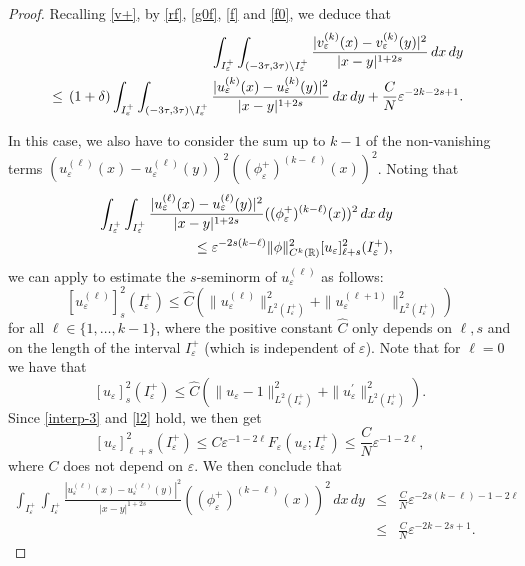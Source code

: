 \documentclass{article}
\newcommand{\e}{\varepsilon}
\begin{document}
\begin{proof}
Recalling \eqref{v+}, by \eqref{rf}, \eqref{g0f}, \eqref{f} and \eqref{f0}, we deduce that 
\begin{eqnarray}\label{tau+}
&&\hspace{-12mm}\int_{I_\e^+}\int_{(-3\tau,3\tau)\setminus I_\e^+}\frac{|v_\e^{(k)}(x)-v_\e^{(k)}(y)|^2}{|x-y|^{1+2s}}\, dx\, dy \nonumber\\
&\hspace{-2mm}\leq&\hspace{-2mm}(1+\delta) \int_{I_\e^+}\int_{(-3\tau,3\tau)\setminus I_\e^+}\frac{|u_\e^{(k)}(x)-u_\e^{(k)}(y)|^2}{|x-y|^{1+2s}}\, dx\, dy+\frac{C}{N}\e^{-2k-2s+1}. 
\end{eqnarray} 

\smallskip 

\noindent{\em Case $3\colon$ $x,y\in I_\e^+$.}

\smallskip
 In this case, we also have to consider the sum up to $k-1$ of the non-vanishing terms
$(u_\e^{(\ell)}(x)-u_\e^{(\ell)}(y))^2((\phi_\e^+)^{(k-\ell)}(x))^2$. 
Noting that 
\begin{eqnarray*}
&&\hspace{-1cm}\int_{I_\e^+}\int_{I_\e^+} \frac{|u_\e^{(\ell)}(x)-u_\e^{(\ell)}(y)|^2}{|x-y|^{1+2s}} ((\phi_\e^+)^{(k-\ell)}(x))^2\, dx\, dy\\
&&\leq \e^{-2s(k-\ell)}\|\phi\|_{C^k(\mathbb R)}^2[u_\e]^2_{\ell+s}(I_\e^+),  
\end{eqnarray*}
we can apply \cite[Theorem 1.25]{leofrac} to estimate the $s$-seminorm of $u^{(\ell)}_\e$ as follows: 
\begin{equation}\label{semi}
[u^{(\ell)}_\e]^2_s(I_\e^+)\leq  \hat C(\|u_\e^{(\ell)}\|^2_{L^2(I_\e^+)}+\|u_\e^{(\ell+1)}\|^2_{L^2(I_\e^+)})
\end{equation}
for all $\ell\in\{1,\dots, k-1\}$,  
where the positive constant $\hat C$ only depends on $\ell,s$ and on the length of the interval $I_\e^+$ (which is independent of $\e$).  Note that for $\ell=0$ we have that 
\begin{equation}\label{semi0}
[u_\e]^2_{s}(I_\e^+)\leq  \hat C(\|u_\e-1\|^2_{L^2(I_\e^+)}+\|u_\e^{\prime}\|^2_{L^2(I_\e^+)}). 
\end{equation}
Since \eqref{interp-3} and \eqref{l2} hold, we then get 
\begin{equation}\label{semibis}
[u_\e]^2_{\ell+s}(I_\e^+)\leq  C\e^{-1-2\ell} F_{\e}(u_\e;I_\e^+)\leq \frac{C}{N}\e^{-1-2\ell}, 
\end{equation}
where $C$ does not depend on $\e$. 
We then conclude that 
\begin{eqnarray}\label{dop}
\int_{I_\e^+}\int_{I_\e^+} \frac{|u_\e^{(\ell)}(x)-u_\e^{(\ell)}(y)|^2}{|x-y|^{1+2s}} ((\phi_\e^+)^{(k-\ell)}(x))^2\, dx\, dy&\leq&\frac{C}{N}\e^{-2s(k-\ell)-1-2\ell}\nonumber\\
&\leq&\frac{C}{N}\e^{-2k-2s+1}.  
\end{eqnarray}



\end{proof}
\end{document}
